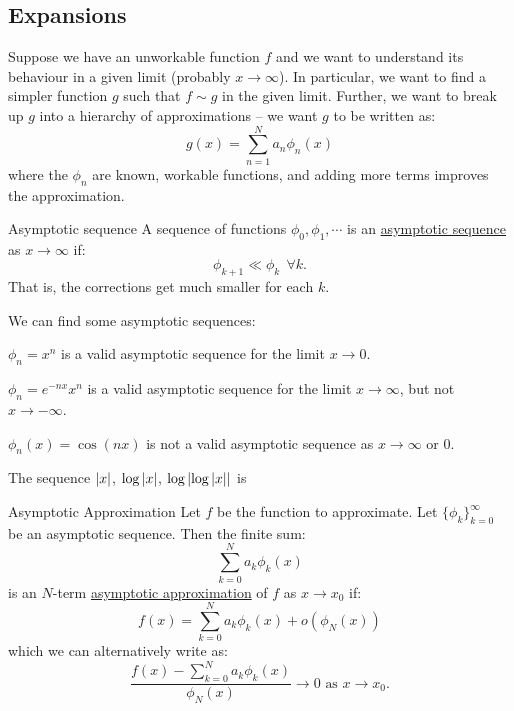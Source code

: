 \documentclass[../Main.tex]{subfiles}
\begin{document}
\subsection{Expansions}
Suppose we have an unworkable function $f$ and we want to understand its behaviour in a given limit (probably $x \to \infty$). In particular, we want to find a simpler function $g$ such that $f \sim g$ in the given limit. Further, we want to break up $g$ into a hierarchy of approximations -- we want $g$ to be written as:
\begin{equation*}
    g(x) = \sum_{n=1}^N a_n \phi_n(x)
\end{equation*}
where the $\phi_n$ are known, workable functions, and adding more terms improves the approximation.
\begin{definition}{Asymptotic sequence}
    A sequence of functions $\phi_0, \phi_1, \cdots$ is an \underline{asymptotic sequence} as $x \to \infty$ if:
    \begin{equation*}
        \phi_{k+1} \ll \phi_k~~\forall k.
    \end{equation*}
    That is, the corrections get much smaller for each $k$.
\end{definition}
\begin{examples}{
        We can find some asymptotic sequences:
    }
    \item $\phi_n = x^n$ is a valid asymptotic sequence for the limit $x \to 0$.
    \item $\phi_n = e^{-nx} x^n$ is a valid asymptotic sequence for the limit $x \to \infty$, but not $x \to -\infty$.
    \item $\phi_n(x) = \cos(nx)$ is not a valid asymptotic sequence as $x \to \infty$ or $0$.
    \item The sequence $\left|x\right|$, $\log\left|x\right|$, $\log\left|\log{\left|x\right|}\right|$ is %
\end{examples}
\begin{definition}{Asymptotic Approximation}
    Let $f$ be the function to approximate. Let $\{\phi_k\}_{k=0}^\infty$ be an asymptotic sequence. Then the finite sum:
    \begin{equation*}
        \sum_{k=0}^{N}a_k \phi_k(x)
    \end{equation*}
    is an $N$-term \underline{asymptotic approximation} of $f$ as $x \to x_0$ if:
    \begin{equation}
        f(x) = \sum_{k=0}^{N} a_k \phi_k(x) + o\left(\phi_N(x)\right)
        \label{eqnAsymApprox}
    \end{equation}
    which we can alternatively write as:
    \begin{equation*}
        \frac{f(x) - \sum_{k=0}^{N} a_k \phi_k(x)}{\phi_N(x)} \to 0 \text{ as $x \to x_0$.}
    \end{equation*}
\end{definition}
\end{document}
